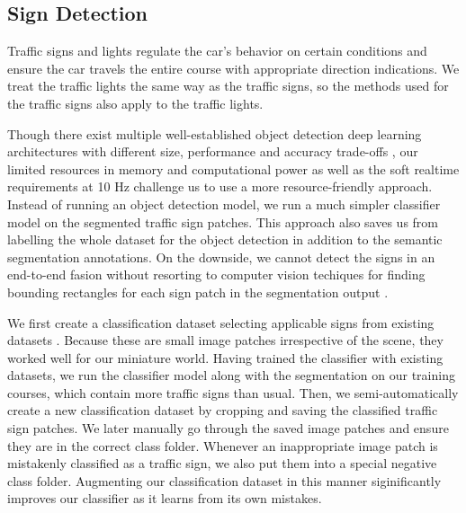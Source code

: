 \subsection{Sign Detection}

Traffic signs and lights regulate the car's behavior on certain conditions and
ensure the car travels the entire course with appropriate direction indications.
We treat the traffic lights the same way as the traffic signs, so the methods
used for the traffic signs also apply to the traffic lights.

Though there exist multiple well-established object detection deep learning
architectures with different size, performance and accuracy trade-offs
\cite{Gupta2019PerformanceCO, Rezatofighi2019GeneralizedIO}, our limited
resources in memory and computational power as well as the soft realtime
requirements at 10 Hz challenge us to use a more resource-friendly approach.
Instead of running an object detection model, we run a much simpler classifier
model on the segmented traffic sign patches. This approach also saves us from
labelling the whole dataset for the object detection in addition to the
semantic segmentation annotations. On the downside, we cannot detect the signs
in an end-to-end fasion without resorting to computer vision techiques for
finding bounding rectangles for each sign patch in the segmentation output
\cite{Bradski2000CV}.

We first create a classification dataset selecting applicable signs from
existing datasets \cite{Timofte2009MultiviewTS, Stallkamp2012ManVC}. Because
these are small image patches irrespective of the scene, they worked well for
our miniature world. Having trained the classifier with existing datasets, we
run the classifier model along with the segmentation on our training courses,
which contain more traffic signs than usual. Then, we semi-automatically create
a new classification dataset by cropping and saving the classified traffic sign
patches. We later manually go through the saved image patches and ensure they
are in the correct class folder. Whenever an inappropriate image patch is
mistakenly classified as a traffic sign, we also put them into a special
negative class folder. Augmenting our classification dataset in this manner
siginificantly improves our classifier as it learns from its own mistakes.

